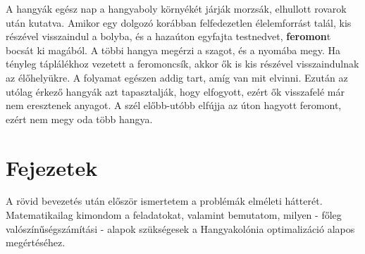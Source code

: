 A hangyák egész nap a hangyaboly környékét járják morzsák, elhullott rovarok után kutatva. Amikor egy dolgozó korábban felfedezetlen élelemforrást talál, kis részével visszaindul a bolyba, és a hazaúton egyfajta testnedvet, \textbf{feromon}t bocsát ki magából. A többi hangya megérzi a szagot, és a nyomába megy. Ha tényleg táplálékhoz vezetett a feromoncsík, akkor ők is kis részével visszaindulnak az élőhelyükre. A folyamat egészen addig tart, amíg van mit elvinni. Ezután az utólag érkező hangyák azt tapasztalják, hogy elfogyott, ezért ők visszafelé már nem eresztenek anyagot. A szél előbb-utóbb elfújja az úton hagyott feromont, ezért nem megy oda több hangya.

\section{Fejezetek}
A rövid bevezetés után először ismertetem a problémák elméleti hátterét. Matematikailag kimondom a feladatokat, valamint bemutatom, milyen - főleg valószínűségszámítási - alapok szükségesek a Hangyakolónia optimalizáció alapos megértéséhez.



